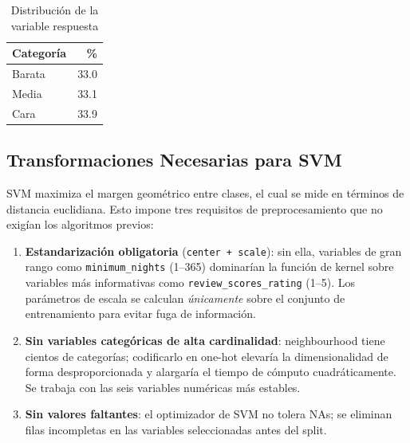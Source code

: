 \documentclass[
]{article}
\newenvironment{Shaded}{\begin{snugshade}}{\end{snugshade}}
\newcommand{\AttributeTok}[1]{\textcolor[rgb]{0.13,0.29,0.53}{#1}}
\newcommand{\ConstantTok}[1]{\textcolor[rgb]{0.56,0.35,0.01}{#1}}
\newcommand{\DecValTok}[1]{\textcolor[rgb]{0.00,0.00,0.81}{#1}}
\newcommand{\FunctionTok}[1]{\textcolor[rgb]{0.13,0.29,0.53}{\textbf{#1}}}
\newcommand{\NormalTok}[1]{#1}
\newcommand{\SpecialCharTok}[1]{\textcolor[rgb]{0.81,0.36,0.00}{\textbf{#1}}}
\newcommand{\StringTok}[1]{\textcolor[rgb]{0.31,0.60,0.02}{#1}}
\begin{document}
\begin{Shaded}
\end{Shaded}

\begin{longtable}[t]{lr}
\caption{\label{tab:carga-datos}Distribución de la variable respuesta}\\
\toprule
Categoría & \%\\
\midrule
Barata & 33.0\\
Media & 33.1\\
Cara & 33.9\\
\bottomrule
\end{longtable}

\subsection{Transformaciones Necesarias para
SVM}\label{transformaciones-necesarias-para-svm}

SVM maximiza el margen geométrico entre clases, el cual se mide en
términos de distancia euclidiana. Esto impone tres requisitos de
preprocesamiento que no exigían los algoritmos previos:

\begin{enumerate}
\def\labelenumi{\arabic{enumi}.}
\item
  \textbf{Estandarización obligatoria} (\texttt{center\ +\ scale}): sin
  ella, variables de gran rango como \texttt{minimum\_nights} (1--365)
  dominarían la función de kernel sobre variables más informativas como
  \texttt{review\_scores\_rating} (1--5). Los parámetros de escala se
  calculan \emph{únicamente} sobre el conjunto de entrenamiento para
  evitar fuga de información.
\item
  \textbf{Sin variables categóricas de alta cardinalidad}: neighbourhood
  tiene cientos de categorías; codificarlo en one-hot elevaría la
  dimensionalidad de forma desproporcionada y alargaría el tiempo de
  cómputo cuadráticamente. Se trabaja con las seis variables numéricas
  más estables.
\item
  \textbf{Sin valores faltantes}: el optimizador de SVM no tolera NAs;
  se eliminan filas incompletas en las variables seleccionadas antes del
  split.
\end{enumerate}
\end{document}
